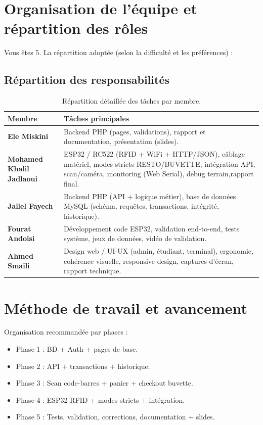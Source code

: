 \documentclass[12pt,a4paper]{report}
\newcommand{\MemberA}{Ele Miskini}
\newcommand{\MemberB}{Mohamed Khalil Jadlaoui}
\newcommand{\MemberC}{Jallel Fayech}
\newcommand{\MemberD}{Fourat Andolsi}
\newcommand{\MemberE}{Ahmed Smaili}
\begin{document}
\section{Organisation de l’équipe et répartition des rôles}
Vous êtes 5. La répartition adoptée (selon la difficulté et les préférences) :

\subsection{Répartition des responsabilités}
\begin{table}[H]
\centering
\begin{tabular}{p{} p{}}
\toprule
\textbf{Membre} & \textbf{Tâches principales}\\
\midrule

\textbf{\MemberA} & 
Backend PHP (pages, validations), rapport et documentation, présentation (slides). \\

\textbf{\MemberB} & 
ESP32 / RC522 (RFID + WiFi + HTTP/JSON), câblage matériel, modes stricts RESTO/BUVETTE, intégration API, scan/caméra, monitoring (Web Serial), debug terrain,rapport final. \\

\textbf{\MemberC} & 
Backend PHP (API + logique métier), base de données MySQL (schéma, requêtes, transactions, intégrité, historique). \\

\textbf{\MemberD} & 
Développement code ESP32, validation end-to-end, tests système, jeux de données, vidéo de validation. \\

\textbf{\MemberE} & 
Design web / UI-UX (admin, étudiant, terminal), ergonomie, cohérence visuelle, responsive design, captures d’écran, rapport technique. \\

\bottomrule
\end{tabular}
\caption{Répartition détaillée des tâches par membre.}
\end{table}

\section{Méthode de travail et avancement}
Organisation recommandée par phases :
\begin{itemize}
  \item Phase 1 : BD + Auth + pages de base.
  \item Phase 2 : API + transactions + historique.
  \item Phase 3 : Scan code-barres + panier + checkout buvette.
  \item Phase 4 : ESP32 RFID + modes stricts + intégration.
  \item Phase 5 : Tests, validation, corrections, documentation + slides.
\end{itemize}
\end{document}
